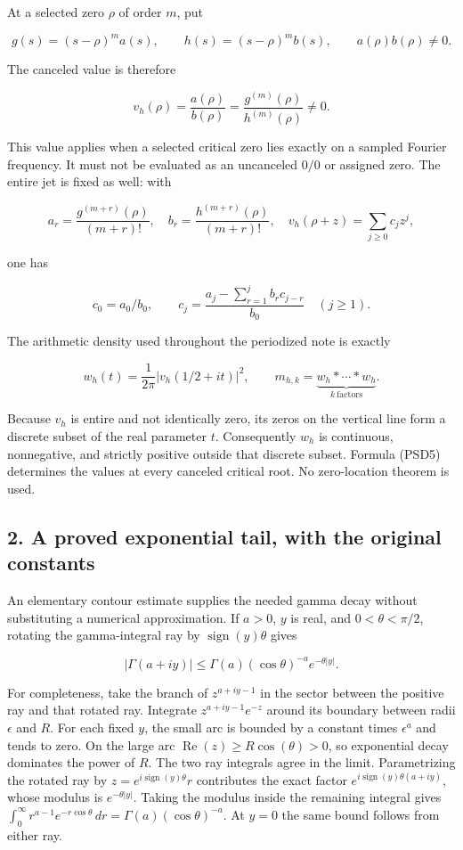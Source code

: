 At a selected zero \(\rho\) of order \(m\), put

\[
g(s)=(s-\rho)^m a(s),\qquad h(s)=(s-\rho)^m b(s),
\qquad a(\rho)b(\rho)\ne0.
\]

The canceled value is therefore

\[
v_h(\rho)=\frac{a(\rho)}{b(\rho)}
=\frac{g^{(m)}(\rho)}{h^{(m)}(\rho)}\ne0.
\tag{PSD5}
\]

This value applies when a selected critical zero lies exactly on a sampled Fourier frequency. It must not be evaluated as an uncanceled \(0/0\) or assigned zero. The entire jet is fixed as well: with

\[
a_r=\frac{g^{(m+r)}(\rho)}{(m+r)!},\quad
b_r=\frac{h^{(m+r)}(\rho)}{(m+r)!},\quad
v_h(\rho+z)=\sum_{j\ge0}c_jz^j,
\]

one has

\[
c_0=a_0/b_0,\qquad
c_j=\frac{a_j-\sum_{r=1}^j b_r c_{j-r}}{b_0}\quad(j\ge1).
\tag{PSD6}
\]

The arithmetic density used throughout the periodized note is exactly

\[
w_h(t)=\frac1{2\pi}\left|v_h(1/2+it)\right|^2,
\qquad m_{h,k}=\underbrace{w_h*\cdots*w_h}_{k\ \mathrm{factors}}.
\tag{PSD7}
\]

Because \(v_h\) is entire and not identically zero, its zeros on the vertical line form a discrete subset of the real parameter \(t\). Consequently \(w_h\) is continuous, nonnegative, and strictly positive outside that discrete subset. Formula (PSD5) determines the values at every canceled critical root. No zero-location theorem is used.

\subsection{2. A proved exponential tail, with the original constants}\label{GraphV2:a-proved-exponential-tail-with-the-original-constants}

An elementary contour estimate supplies the needed gamma decay without substituting a numerical approximation. If \(a>0\), \(y\) is real, and \(0<\theta<\pi/2\), rotating the gamma-integral ray by \(\operatorname{sign}(y) \theta\) gives

\[
|\Gamma(a+iy)|
\le \Gamma(a)(\cos\theta)^{-a}e^{-\theta|y|}.
\tag{PSD8}
\]

For completeness, take the branch of \(z^{a+iy-1}\) in the sector between the positive ray and that rotated ray. Integrate \(z^{a+iy-1}e^{-z}\) around its boundary between radii \(\epsilon\) and \(R\). For each fixed \(y\), the small arc is bounded by a constant times \(\epsilon^a\) and tends to zero. On the large arc \(\operatorname{Re}(z)\ge R \cos(\theta)>0\), so exponential decay dominates the power of \(R\). The two ray integrals agree in the limit. Parametrizing the rotated ray by \(z=e^{i \operatorname{sign}(y) \theta}r\) contributes the exact factor \(e^{i \operatorname{sign}(y) \theta(a+iy)}\), whose modulus is \(e^{-\theta|y|}\). Taking the modulus inside the remaining integral gives \(\int_0^\infty r^{a-1}e^{-r\cos\theta}\,dr=\Gamma(a)(\cos\theta)^{-a}\). At \(y=0\) the same bound follows from either ray.

